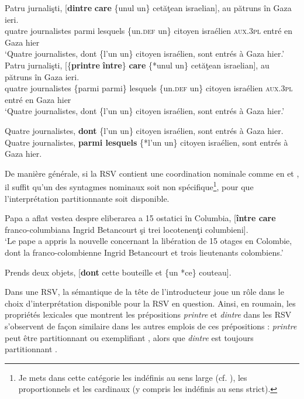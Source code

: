 \ea \label{ch3:ex70}
\ea 
\gll Patru  jurnalişti,  [\textbf{dintre}  \textbf{care}  \{unul  {\textbar}  un\}  cetăţean  israelian], au  pătruns  în  Gaza  ieri. \label{ch3:ex70a}\\
quatre  journalistes  parmi  lesquels  \{un.\textsc{def}  {\textbar}  un\}  citoyen  israélien \textsc{aux.3pl}  entré  en  Gaza  hier \\
\glt ‘Quatre journalistes, dont \{l’un {\textbar} un\} citoyen israélien, sont entrés à Gaza hier.’
\ex
\gll Patru  jurnalişti,  [\{\textbf{printre}  {\textbar}  \textbf{între}\}  \textbf{care}  \{*unul  {\textbar}  un\}  cetăţean israelian],  au  pătruns  în  Gaza  ieri. \label{ch3:ex70b}\\
quatre  journalistes  \{parmi  {\textbar}  parmi\}  lesquels  \{un.\textsc{def}  {\textbar}  un\}  citoyen israélien  \textsc{aux.3pl}  entré  en  Gaza  hier\\
\glt ‘Quatre journalistes, dont \{l’un {\textbar} un\} citoyen israélien, sont entrés à Gaza hier.’
\z 
\z


\ea \label{ch3:ex71}
\ea
Quatre journalistes, \textbf{dont} \{l'un {\textbar} un\} citoyen israélien, sont entrés à Gaza hier. \label{ch3:ex71a} 
\ex 
Quatre journalistes, \textbf{parmi lesquels} \{*l’un {\textbar} un\} citoyen israélien, sont entrés à Gaza hier. \label{ch3:ex71b}
\z 
\z

De manière générale, si la RSV contient une coordination nominale comme en  et , il suffit qu’un des syntagmes nominaux soit non spécifique\footnote{Je mets dans cette catégorie les indéfinis au sens large (cf. \citealt{Corblin1997}), {\cad} les proportionnels et les cardinaux (y compris les indéfinis au sens strict).}, pour que l’interprétation partitionnante soit disponible.

\ea \label{ch3:ex72} 
Papa a aflat vestea despre eliberarea a 15 ostatici în Columbia, [\textbf{între care} franco-columbiana Ingrid Betancourt şi trei locotenenţi columbieni]. \\
\glt ‘Le pape a appris la nouvelle concernant la libération de 15 otages en Colombie, dont la franco-colombienne Ingrid Betancourt et trois lieutenants colombiens.’ 
\z

\ea \label{ch3:ex73} 
Prends deux objets, [\textbf{dont} cette bouteille et \{un {\textbar} *ce\} couteau].
\z

Dans une RSV, la sémantique de la tête de l’introducteur joue un rôle dans le choix d’interprétation disponible pour la RSV en question. Ainsi, en roumain, les propriétés lexicales que montrent les prépositions \textit{printre} et \textit{dintre} dans les RSV s’observent de façon similaire dans les autres emplois de ces prépositions : \textit{printre} peut être partitionnant ou exemplifiant , alors que \textit{dintre} est toujours partitionnant . 

